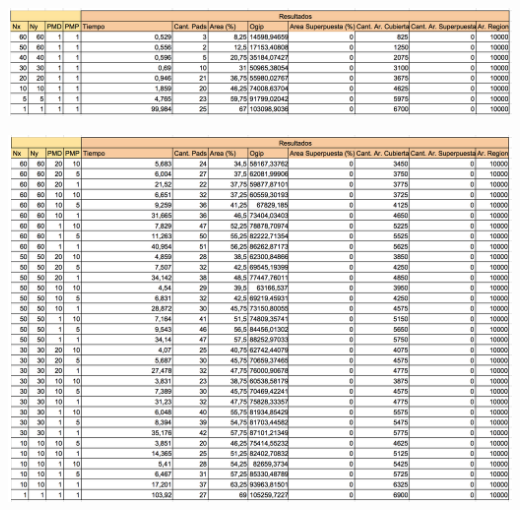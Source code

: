 \begin{center}
\includegraphics[width=1\textwidth]{imagenes/G_45G100x100_muchos}
\end{center}

\begin{center}
\includegraphics[width=1\textwidth]{imagenes/GML_45G100x100_muchos}
\end{center}

